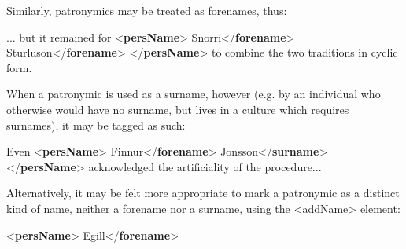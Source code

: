 Similarly, patronymics may be treated as forenames, thus: \par\bgroup{}\exampleFont \begin{shaded}\noindent\mbox{}... but it remained for {<\textbf{persName}>}\mbox{}\newline 
{}Snorri{</\textbf{forename}>}\mbox{}\newline 
{}Sturluson{</\textbf{forename}>}\mbox{}\newline 
{</\textbf{persName}>} to combine the two traditions in cyclic form.\end{shaded}\egroup\par \noindent  When a patronymic is used as a surname, however (e.g. by an individual who otherwise would have no surname, but lives in a culture which requires surnames), it may be tagged as such: \par\bgroup{}\exampleFont \begin{shaded}\noindent\mbox{}Even {<\textbf{persName}>}\mbox{}\newline 
{}Finnur{</\textbf{forename}>}\mbox{}\newline 
{}Jonsson{</\textbf{surname}>}\mbox{}\newline 
{</\textbf{persName}>} acknowledged the artificiality of the procedure...\end{shaded}\egroup\par \noindent  Alternatively, it may be felt more appropriate to mark a patronymic as a distinct kind of name, neither a forename nor a surname, using the \hyperref[TEI.addName]{<addName>} element: \par\bgroup{}\exampleFont \begin{shaded}\noindent\mbox{}{<\textbf{persName}>}\mbox{}\newline 
{}Egill{</\textbf{forename}>}\mbox{}\newline 

\end{shaded}
